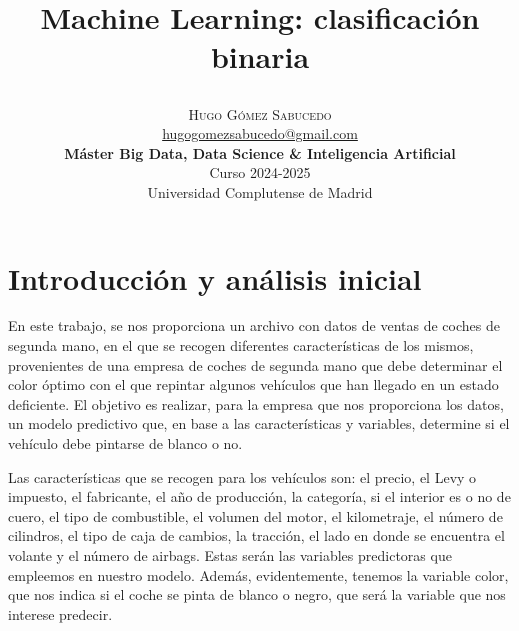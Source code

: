 \documentclass[a4paper,onecolumn]{extarticle}
\title{\begin{center} \Huge Machine Learning: clasificación binaria\end{center}} %
\author{
    \textsc{\Huge Hugo Gómez Sabucedo} \\ %
    \large \href{mailto:hugogomezsabucedo@gmail.com}{hugogomezsabucedo@gmail.com} \\ [2ex] %
    \Large \textbf{Máster Big Data, Data Science \& Inteligencia Artificial} \\
    \normalsize Curso 2024-2025 \\
    \large Universidad Complutense de Madrid
}
\date{} %
\let\stdsection\section
\renewcommand\section{\newpage\stdsection}
\begin{document}
\maketitle
\tableofcontents
\begin{sloppypar}


\section{Introducción y análisis inicial} \label{introduccion}
En este trabajo, se nos proporciona un archivo con datos de ventas de coches de segunda mano, en el que se recogen diferentes características de los mismos, 
provenientes de una empresa de coches de segunda mano que debe determinar el color óptimo con el que repintar algunos vehículos que han llegado en un estado 
deficiente. El objetivo es realizar, para la empresa que nos proporciona los datos, un modelo predictivo que, en base a las características y variables, determine
si el vehículo debe pintarse de blanco o no.

Las características que se recogen para los vehículos son: el precio, el Levy o impuesto, el fabricante, el año de producción, la categoría, si el interior es 
o no de cuero, el tipo de combustible, el volumen del motor, el kilometraje, el número de cilindros, el tipo de caja de cambios, la tracción, el lado en donde 
se encuentra el volante y el número de airbags. Estas serán las variables predictoras que empleemos en nuestro modelo. Además, evidentemente, tenemos la variable 
color, que nos indica si el coche se pinta de blanco o negro, que será la variable que nos interese predecir.


\end{sloppypar}
\end{document}
